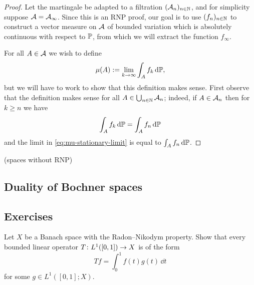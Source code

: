 \begin{proof}
  Let the martingale be adapted to a filtration $(\mc{A}_n)_{n \in \N}$, and for simplicity suppose $\mc{A} = \mc{A}_\infty$.
  Since this is an RNP proof, our goal is to use $(f_n)_{n \in \N}$ to construct a vector measure on $\mc{A}$ of bounded variation which is absolutely continuous with respect to $\P$, from which we will extract the function $f_\infty$.

  For all $A \in \mc{A}$ we wish to define
  \begin{equation}\label{eq:mu-stationary-limit}
    \mu(A) := \lim_{k \to \infty} \int_A f_k \, \dd\P,
  \end{equation}
  but we will have to work to show that this definition makes sense.
  First observe that the definition makes sense for all $A \in \bigcup_{n \in \N} \mc{A}_{n}$; indeed, if $A \in \mc{A}_{n}$ then for $k \geq n$ we have
  \begin{equation*}
    \int_A f_k \, \dd\P = \int_A f_n \, \dd \P
  \end{equation*}
  and the limit in \eqref{eq:mu-stationary-limit} is equal to $\int_A f_n \, \dd\P$.
\end{proof}

\begin{cor}
  (spaces without RNP)
\end{cor}

\subsection{Duality of Bochner spaces}

\subsection*{Exercises}


\begin{exercise}
  Let $X$ be a Banach space with the Radon--Nikodym property.
  Show that every bounded linear operator $\map{T}{L^1([0,1])}{X}$ is of the form
  \begin{equation*}
    Tf = \int_0^1 f(t) g(t) \, \dd t
  \end{equation*}
  for some $g \in L^1([0,1];X)$.
\end{exercise}


